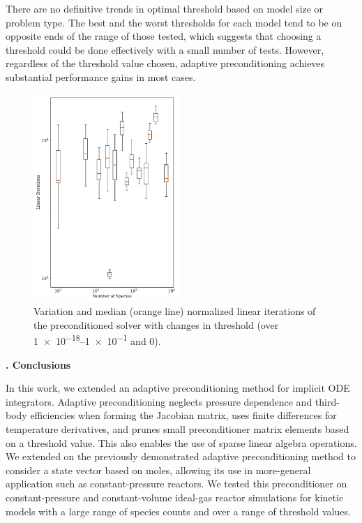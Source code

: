 \documentclass[twocolumn,10pt]{article}
\renewcommand{\section}%
              [1]%
              {%
               \bgroup%
               \flushleft%
               \small\bf%
               \stepcounter{section}%
               \arabic{section}. #1%
               \par%
               \egroup%
              }%
\newcommand{\sectionOne}[1]{\section{#1} \addvspace{10pt}}
\begin{document}
There are no definitive trends in optimal threshold based on model size or problem type.
The best and the worst thresholds for each model tend to be on opposite ends of the range of those tested, which suggests that choosing a threshold could be done effectively with a small number of tests.
However, regardless of the threshold value chosen, adaptive preconditioning achieves substantial performance gains in most cases.

\begin{figure}[htb]
\centering
\includegraphics[width=0.49\textwidth]{figures/Iterations-BoxWhisker-pressure_problem.pdf}
\caption{Variation and median (orange line) normalized linear iterations of the preconditioned solver with changes in threshold (over \numrange{1e-18}{1e-1} and 0).}
\label{fig:box_whisker_iterations}
\end{figure}

\sectionOne{Conclusions}

In this work, we extended an adaptive preconditioning method for implicit ODE integrators.
Adaptive preconditioning neglects pressure dependence and third-body efficiencies when forming the Jacobian matrix,
uses finite differences for temperature derivatives, and prunes small preconditioner matrix elements based on a threshold value.
This also enables the use of sparse linear algebra operations.
We extended on the previously demonstrated adaptive preconditioning method to consider a state vector based on moles, allowing its use in more-general application such as constant-pressure reactors.
We tested this preconditioner on constant-pressure and constant-volume ideal-gas reactor simulations for kinetic models with a large range of species counts and over a range of threshold values.
\end{document}

